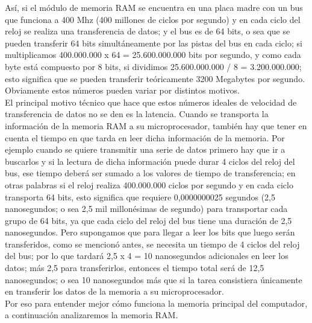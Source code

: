 \documentclass{article}
\begin{document}
Así, si el módulo de memoria RAM se encuentra en una placa madre con un bus que funciona a
400 Mhz (400 millones de ciclos por segundo) y en cada ciclo del reloj se realiza una
transferencia de datos; y el bus es de 64 bits, o sea que se pueden transferir 64 bits
simultáneamente por las pistas del bus en cada ciclo; si multiplicamos 400.000.000 x 64 =
25.600.000.000 bits por segundo, y como cada byte está compuesto por 8 bits, si dividimos
25.600.000.000 / 8 = 3.200.000.000; esto significa que se pueden transferir teóricamente 3200
Megabytes por segundo. Obviamente estos números pueden variar por distintos motivos.\\[0.1cm]
El principal motivo técnico que hace que estos números ideales de velocidad de transferencia
de datos no se den es la latencia. Cuando se transporta la información de la memoria RAM a su
microprocesador, también hay que tener en cuenta el tiempo en que tarda en leer dicha
información de la memoria. Por ejemplo cuando se quiere transmitir una serie de datos primero
hay que ir a buscarlos y si la lectura de dicha información puede durar 4 ciclos del reloj del bus,
ese tiempo deberá ser sumado a los valores de tiempo de transferencia; en otras palabras si el
reloj realiza 400.000.000 ciclos por segundo y en cada ciclo transporta 64 bits, esto significa
que requiere 0,0000000025 segundos (2,5 nanosegundos; o sea 2,5 mil millonésimas de
segundo) para transportar cada grupo de 64 bits, ya que cada ciclo del reloj del bus tiene una
duración de 2,5 nanosegundos. Pero supongamos que para llegar a leer los bits que luego serán
transferidos, como se mencionó antes, se necesita un tiempo de 4 ciclos del reloj del bus; por lo
que tardará 2,5 x 4 = 10 nanosegundos adicionales en leer los datos; más 2,5 para transferirlos,
entonces el tiempo total será de 12,5 nanosegundos; o sea 10 nanosegundos más que si la tarea
consistiera únicamente en transferir los datos de la memoria a su microprocesador.\\[0.1cm]
Por eso para entender mejor cómo funciona la memoria principal del computador, a
continuación analizaremos la memoria RAM.
\end{document}

